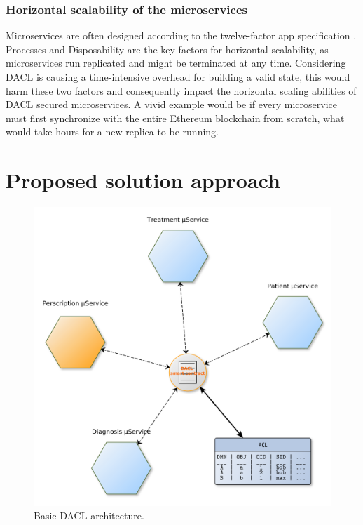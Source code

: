 \documentclass[12pt, conference]{IEEEtran}
\begin{document}
\subsubsection{Horizontal scalability of the microservices}

Microservices are often designed according to the twelve-factor app specification \cite{site1}. Processes and Disposability are the key factors for horizontal scalability, as microservices run replicated and might be terminated at any time. Considering DACL is causing a time-intensive overhead for building a valid state, this would harm these two factors and consequently impact the horizontal scaling abilities of DACL secured microservices. A vivid example would be if every microservice must first synchronize with the entire Ethereum blockchain from scratch, what would take hours for a new replica to be running.


\section{Proposed solution approach}


\begin{figure}[!h]
    \centering
  \includegraphics[width=\linewidth]{figures/DACL-basic.png}
  \caption{Basic DACL architecture.}
  \label{fig:basic-dacl}
\end{figure}
\end{document}
